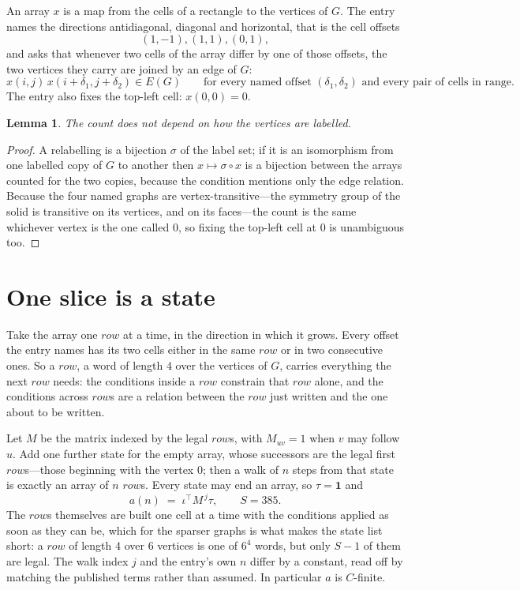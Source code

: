 \documentclass[11pt,a4paper]{article}
\theoremstyle{plain}
\newtheorem{lemma}[theorem]{Lemma}
\theoremstyle{definition}
\begin{document}
An array $x$ is a map from the cells of a rectangle to the vertices of $G$. The entry names the
directions antidiagonal, diagonal and horizontal, that is the cell offsets
\[
(1,-1), (1,1), (0,1),
\]
and asks that whenever two cells of the array differ by one of those offsets, the two vertices
they carry are joined by an edge of $G$:
\[
x(i,j)\,x(i+\delta_1,j+\delta_2)\in E(G)\qquad
\text{for every named offset } (\delta_1,\delta_2)\text{ and every pair of cells in range.}
\]
The entry also fixes the top-left cell: $x(0,0)=0$.

\begin{lemma}\label{lem:label}
The count does not depend on how the vertices are labelled.
\end{lemma}

\begin{proof}
A relabelling is a bijection $\sigma$ of the label set; if it is an isomorphism from one
labelled copy of $G$ to another then $x\mapsto\sigma\circ x$ is a bijection between the arrays
counted for the two copies, because the condition mentions only the edge relation.
Because the four named graphs are vertex-transitive---the symmetry group of the solid is transitive on its vertices, and on its faces---the count is the same whichever vertex is the one called $0$, so fixing the top-left cell at $0$ is unambiguous too.
\end{proof}

\section{One slice is a state}

Take the array one $row$ at a time, in the direction in which it grows.
Every offset the entry names has its two cells either in the same $row$ or in two
consecutive ones. So a $row$, a word of length $4$ over the vertices of $G$, carries
everything the next $row$ needs: the conditions inside a $row$ constrain that
$row$ alone, and the conditions across $row$s are a relation between the
$row$ just written and the one about to be written.

Let $M$ be the matrix indexed by the legal $row$s, with $M_{uv}=1$ when $v$ may
follow $u$. Add one further state for the empty array, whose successors are the legal first
$row$s---those beginning with the vertex $0$; then a walk of
$n$ steps from that state is exactly an array of $n$ $row$s. Every state may end an
array, so $\tau=\mathbf{1}$ and
\[
a(n)\;=\;\iota^{\!\top}M^{\,j}\tau ,\qquad S=385.
\]
The $row$s themselves are built one cell at a time with the conditions applied as soon
as they can be, which for the sparser graphs is what makes the state list short: a $row$
of length $4$ over $6$ vertices is one of $6^{4}$ words, but only $S-1$ of them are
legal. The walk index $j$ and the entry's own $n$ differ by a constant, read off by matching the
published terms rather than assumed. In particular $a$ is $C$-finite.
\end{document}
